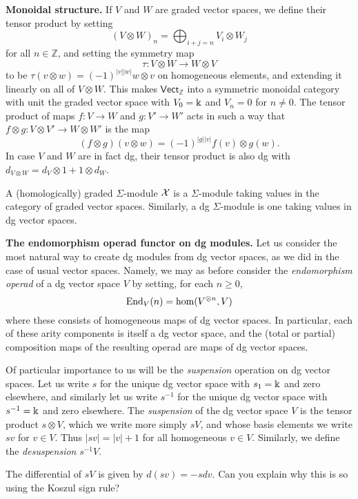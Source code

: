 \textbf{Monoidal structure.} If $V$ and $W$ are
graded vector spaces, we define their tensor product
by setting
\[ (V\otimes W)_n = \bigoplus_{i+j = n} V_i\otimes W_j \]
for all $n\in\mathbb Z$, and setting the symmetry map
\[\tau : V\otimes W \longrightarrow W\otimes V\]
to be $\tau(v\otimes w) = (-1)^{|v||w|}w\otimes v$
on homogeneous elements, and extending it linearly on all of
$V\otimes W$. This makes $\mathsf{Vect}_\mathbb{Z}$ into a
symmetric monoidal category with unit the graded vector
space with $V_0 = \Bbbk$ and $V_n = 0$ for $n\neq 0$.
The tensor product of maps $f: V\longrightarrow W$
and $g : V'\longrightarrow W'$ acts
in such a way that $f\otimes g : V\otimes V'
\longrightarrow W\otimes W'$ is the map
\[ (f\otimes g)(v\otimes w)  = (-1)^{|g||v|} f(v)\otimes g(w).\]
In case $V$ and $W$ are in fact dg, their tensor product is
also dg with $d_{V\otimes W} = d_V\otimes 1+ 1\otimes d_W$. 

\begin{definition}
A (homologically) graded $\Sigma$-module $\mathcal{X}$
is a $\Sigma$-module taking values in the category
of graded vector spaces. Similarly, a dg $\Sigma$-module
is one taking values in dg vector spaces.
\end{definition}

\textbf{The endomorphism operad functor on dg modules.}
Let us consider the most natural way to create dg modules
from dg vector spaces, as we did in the case of usual
vector spaces. Namely, we may as before consider the
\emph{endomorphism operad} of a dg vector space $V$
by setting, for each $n\geqslant 0$,
\[ \operatorname{End}_V(n) = \hom(V^{\otimes n},V) \]
where these consists of homogeneous maps of dg vector
spaces. In particular, each of these arity components is 
itself a dg vector space, and the (total or partial)
composition maps
of the resulting operad are maps of dg vector spaces.

Of particular importance to us will be the \emph{suspension}
operation on dg vector spaces. Let us write $s$ for the
unique dg vector space with $s_1 = \Bbbk$ and zero
elsewhere, and similarly let us write $s^{-1}$ for the
unique dg vector space with $s^{-1} = \Bbbk$
and zero elsewhere. The \emph{suspension} of the dg vector
space $V$ is the tensor product $s\otimes V$, which
we write more simply $sV$, and whose basis elements we
write $sv$ for $v\in V$. Thus $|sv| = |v|+1$ for all 
homogeneous $v\in V$. Similarly, we define the
\emph{desuspension} $s^{-1}V$.

\begin{note}
The differential of $sV$ is given by $d(sv) = -s dv$. Can you explain why this is so using
the Koszul sign rule?
\end{note}
 
